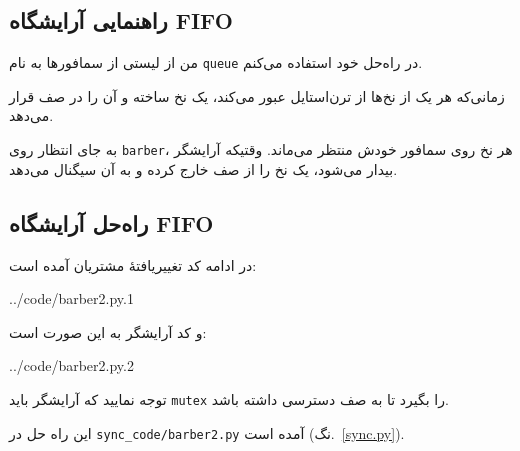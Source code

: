\documentclass{book}
\newcommand{\clearemptydoublepage}{\newpage\cleardoublepage}
\begin{document}
\clearemptydoublepage
\subsection{راهنمایی آرایشگاه FIFO}

	من از لیستی از سمافورها به نام {\tt queue} در راه‌حل خود استفاده می‌کنم.

%


	زمانی‌که هر یک از نخ‌ها از ترن‌استایل عبور می‌کند، یک نخ ساخته و آن را در صف قرار می‌دهد.

	به جای انتظار روی {\tt barber}، هر نخ روی سمافور خودش منتظر می‌ماند. 
	وقتیکه آرایشگر بیدار می‌شود، یک نخ را از صف خارج کرده و به آن سیگنال می‌دهد.


\clearemptydoublepage
\subsection{راه‌حل آرایشگاه FIFO}

	در ادامه کد تغییریافتهٔ مشتریان آمده است:

%

{../code/barber2.py.1}

	و کد آرایشگر به این صورت است:

%

{../code/barber2.py.2}

	توجه نمایید که آرایشگر باید {\tt mutex} را بگیرد تا به صف دسترسی داشته باشد.

	این راه حل در \verb"sync_code/barber2.py" آمده است (نگ.~\ref{sync.py}).
\end{document}
